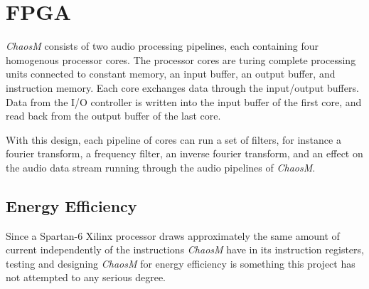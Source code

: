 \FloatBarrier
\section{FPGA}\label{chapter:fpga}

\textit{ChaosM} consists of two audio processing pipelines, each containing four
homogenous processor cores. The processor cores are turing complete processing
units connected to constant memory, an input buffer, an output buffer, and
instruction memory. Each core exchanges data through the input/output buffers.
Data from the I/O controller is written into the input buffer of the first core, and read
back from the output buffer of the last core.

With this design, each pipeline of cores can run a set of filters, for instance
a fourier transform, a frequency filter, an inverse fourier transform, and an
effect on the audio data stream running through the audio pipelines of \textit{ChaosM}.








\subsection{Energy Efficiency}
Since a Spartan-6 Xilinx processor draws approximately the same amount of current
independently of the instructions \textit{ChaosM} have in its instruction registers,
testing and designing \textit{ChaosM} for energy efficiency is something this project
has not attempted to any serious degree.
